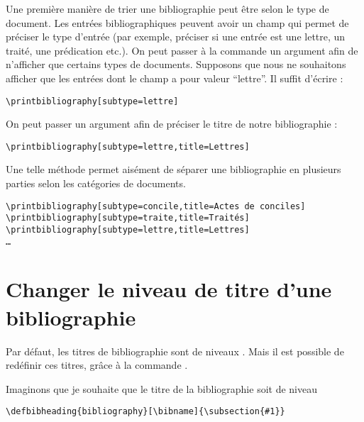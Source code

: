 Une première manière de trier une bibliographie peut être selon le type de document. Les entrées bibliographiques peuvent avoir un champ  qui permet de préciser le type d'entrée (par exemple, préciser si une entrée est une lettre, un traité, une prédication etc.). On peut passer à la commande  un argument afin de n'afficher que certains types de documents. Supposons que nous ne souhaitons afficher que les entrées dont le champ  a pour valeur \enquote{lettre}. Il suffit d'écrire :

\begin{verbatim}
\printbibliography[subtype=lettre]
\end{verbatim}

On peut passer un argument  afin de préciser le titre de notre bibliographie :

\begin{verbatim}
\printbibliography[subtype=lettre,title=Lettres]
\end{verbatim}

Une telle méthode permet aisément de séparer une bibliographie en plusieurs parties selon les catégories de documents.

\begin{verbatim}
\printbibliography[subtype=concile,title=Actes de conciles]
\printbibliography[subtype=traite,title=Traités]
\printbibliography[subtype=lettre,title=Lettres]
…

\end{verbatim}


\section{Changer le niveau de titre d'une bibliographie}

Par défaut, les titres de bibliographie sont de niveaux . Mais il est possible de redéfinir ces titres, grâce à la commande .

Imaginons que je souhaite que le titre de la bibliographie soit de niveau 

\begin{verbatim}
\defbibheading{bibliography}[\bibname]{\subsection{#1}}
\end{verbatim}

